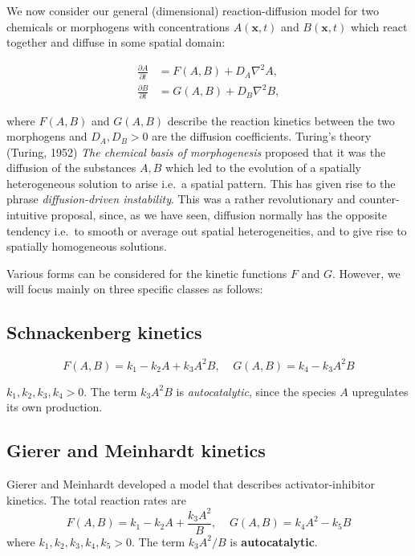 \documentclass[
  letterpaper,
  DIV=11,
  numbers=noendperiod]{scrreprt}
\theoremstyle{definition}
\theoremstyle{plain}
\theoremstyle{plain}
\theoremstyle{remark}
\begin{document}
We now consider our general (dimensional) reaction-diffusion model for
two chemicals or morphogens with concentrations \(A({\mathbf{x}}, t)\)
and \(B({\mathbf{x}}, t)\) which react together and diffuse in some
spatial domain:

\[
\begin{aligned}
\frac{\partial A}{\partial  t} & =  F(A,B)  + D_A \nabla^2 A, \\
\frac{\partial B}{\partial  t} & =  G(A,B)  + D_B \nabla^2 B,
\end{aligned}
\]

where \(F(A,B)\) and \(G(A,B)\) describe the reaction kinetics between
the two morphogens and \(D_A, D_B > 0\) are the diffusion coefficients.
Turing's theory (Turing, 1952) \emph{The chemical basis of
morphogenesis} proposed that it was the diffusion of the substances
\(A, B\) which led to the evolution of a spatially heterogeneous
solution to arise i.e.~a spatial pattern. This has given rise to the
phrase \emph{diffusion-driven instability}. This was a rather
revolutionary and counter-intuitive proposal, since, as we have seen,
diffusion normally has the opposite tendency i.e.~to smooth or average
out spatial heterogeneities, and to give rise to spatially homogeneous
solutions.

Various forms can be considered for the kinetic functions \(F\) and
\(G\). However, we will focus mainly on three specific classes as
follows:

\hypertarget{schnackenberg-kinetics}{%
\subsection{Schnackenberg kinetics}\label{schnackenberg-kinetics}}

\[
F(A,B) = k_1 - k_2 A + k_3 A^2 B, \;\;\;\; G(A,B) = k_4 - k_3 A^2 B
\]

\(k_1, k_2, k_3, k_4 >0\). The term \(k_3 A^2 B\) is
\emph{autocatalytic}, since the species \(A\) upregulates its own
production.

\hypertarget{gierer-and-meinhardt-kinetics}{%
\subsection{Gierer and Meinhardt
kinetics}\label{gierer-and-meinhardt-kinetics}}

Gierer and Meinhardt developed a model that describes
activator-inhibitor kinetics. The total reaction rates are \[
F(A,B) = k_1 - k_2 A + \frac{k_3 A^2}{B}, \;\;\;\; G(A,B) = k_4 A^2 - k_5 B
\] where \(k_1, k_2, k_3, k_4 , k_5 > 0\). The term \(k_3 A^2 / B\) is
\textbf{autocatalytic}.
\end{document}
